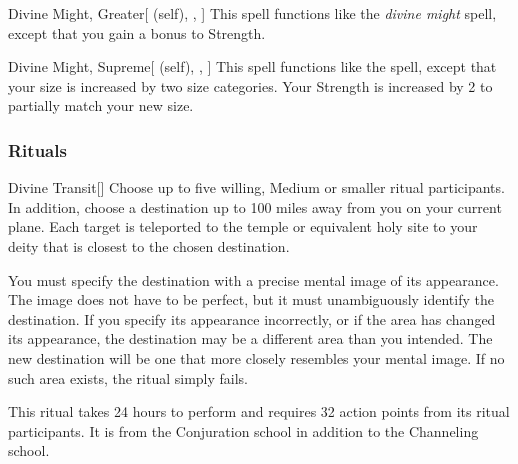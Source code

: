 \lowercase{\hypertarget{spell:Divine Might, Greater}{}}\label{spell:Divine Might, Greater}
\begin{attuneability}[\nth{5}]{\hypertarget{spell:Divine Might, Greater}{Divine Might, Greater}}[ (self), , ]
This spell functions like the \textit{divine might} spell, except that you gain a  bonus to Strength.
\end{attuneability}
\vspace{0.25em}



\lowercase{\hypertarget{spell:Divine Might, Supreme}{}}\label{spell:Divine Might, Supreme}
\begin{attuneability}[\nth{7}]{\hypertarget{spell:Divine Might, Supreme}{Divine Might, Supreme}}[ (self), , ]
This spell functions like the  spell, except that your size is increased by two size categories.
Your Strength is increased by 2 to partially match your new size.
\end{attuneability}
\vspace{0.25em}



\subsubsection{Rituals}


\lowercase{\hypertarget{spell:Divine Transit}{}}\label{spell:Divine Transit}
\begin{apability}[\nth{4}]{\hypertarget{spell:Divine Transit}{Divine Transit}}[]
Choose up to five willing, Medium or smaller ritual participants.
In addition, choose a destination up to 100 miles away from you on your current plane.
Each target is teleported to the temple or equivalent holy site to your deity that is closest to the chosen destination.

You must specify the destination with a precise mental image of its appearance.
The image does not have to be perfect, but it must unambiguously identify the destination.
If you specify its appearance incorrectly, or if the area has changed its appearance, the destination may be a different area than you intended.
The new destination will be one that more closely resembles your mental image.
If no such area exists, the ritual simply fails.

This ritual takes 24 hours to perform and requires 32 action points from its ritual participants.
It is from the Conjuration school in addition to the Channeling school.
\end{apability}
\vspace{0.25em}


